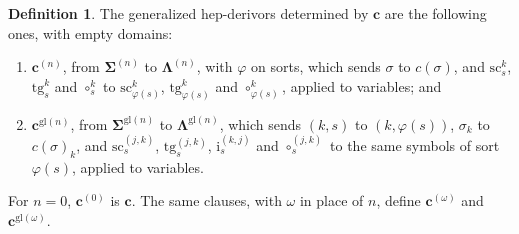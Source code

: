 \documentclass[a4paper,reqno]{amsart}
\newcommand{\sig}[1]{\mathbf{#1}}                %
\newcommand{\gl}{\mathrm{gl}}
\newcommand{\src}{\mathrm{sc}}
\newcommand{\tgt}{\mathrm{tg}}
\newcommand{\ii}{\mathrm{i}}
\theoremstyle{plain}
\theoremstyle{definition}
\newtheorem{definition}[theorem]{Definition}
\begin{document}
\begin{definition}\label{DChangeSigDerivor}
The generalized hep-derivors determined by $\mathbf{c}$ are the following ones, with empty domains:
\begin{enumerate}
\item $\mathbf{c}^{(n)}$, from $\sig{\Sigma}^{(n)}$ to $\sig{\Lambda}^{(n)}$, with $\varphi$ on sorts, which sends $\sigma$ to $c(\sigma)$, and $\src^{k}_{s}$, $\tgt^{k}_{s}$ and $\circ^{k}_{s}$ to $\src^{k}_{\varphi(s)}$, $\tgt^{k}_{\varphi(s)}$ and $\circ^{k}_{\varphi(s)}$, applied to variables; and
\item $\mathbf{c}^{\gl(n)}$, from $\sig{\Sigma}^{\gl(n)}$ to $\sig{\Lambda}^{\gl(n)}$, which sends $(k,s)$ to $(k,\varphi(s))$, $\sigma_{k}$ to $c(\sigma)_{k}$, and $\src^{(j,k)}_{s}$, $\tgt^{(j,k)}_{s}$, $\ii^{(k,j)}_{s}$ and $\circ^{(j,k)}_{s}$ to the same symbols of sort $\varphi(s)$, applied to variables.
\end{enumerate}
For $n=0$, $\mathbf{c}^{(0)}$ is $\mathbf{c}$.
The same clauses, with $\omega$ in place of $n$, define $\mathbf{c}^{(\omega)}$ and $\mathbf{c}^{\gl(\omega)}$.
\end{definition}
\end{document}
